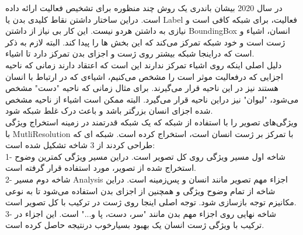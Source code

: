  در سال 2020 بیشان باندری %
 \cite{Body_part_aware_multitask_act}
 یک روش چند منظوره برای تشخیص فعالیت ارائه داده است. دراین ساختار داشتن نقاط کلیدی بدن یا %
\gls{Label}
  فعالیت،‌ برای شبکه کافی است و نیازی به داشتن هردو نیست. این کار بی نیاز از داشتن %
  \gls{BoundingBox}
  انسان، اشیاء و ژست است و خود شبکه تمرکز می‌کند که این بخش ها را پیدا کند. البته لازم به ذکر است که دراینجا شبکه بیشتر روی ژست و اجزای بدن تمرکز دارد تا اشیاء.\\
  دلیل اصلی اینکه روی اشیاء تمرکز ندارند این است که اعتقاد دارند زمانی که ناحیه اجزایی که درفعالیت موثر است را مشخص می‌کنیم، اشیاءی که در ارتباط با انسان هستند نیز در این ناحیه قرار می‌گیرند. برای مثال زمانی که ناحیه "دست" مشخص می‌شود، "لیوان" نیز دراین ناحیه قرار می‌گیرد. البته ممکن است اشیاء از ناحیه مشخص شده اجزای انسان بزرگتر باشد و باعث درک غلط شبکه شود.\\
ویژگی‌های تصویر را با استفاده از شبکه %
 \cite{HRNet_network}
  که یک شبکه قدرتمند در زمینه استخراج ویژگی با %
\gls{MutliResolution}
   با تمرکز بر ژست انسان است،‌ استخراج کرده است. شبکه ای که طراحی کردند از 3 شاخه تشکیل شده است:\\
  1- شاخه اول مسیر ویژگی روی کل تصویر است. دراین مسیر ویژگی کمترین وضوح استخراج شده از تصویر، مورد استفاده قرار گرفته است. \\
  2- شاخه دوم مسیر %
\gls{Analysis}
  اجزاء مهم تصویر مانند انسان و پس‌زمینه است. دراین شاخه از تمام وضوح ویژگی و همچنین از اجزای بدن استفاده می‌شود تا به نوعی مکانیزم توجه بازسازی شود. توجه اصلی اینجا روی ژست در ترکیب با کل تصویر است.\\
  3- شاخه نهایی روی اجزاء مهم بدن مانند "سر، دست، پا و..." است. این اجزاء در ترکیب با ویژگی ژست انسان یک بهبود بسیارخوب درنتیجه حاصل کرده است.
  
